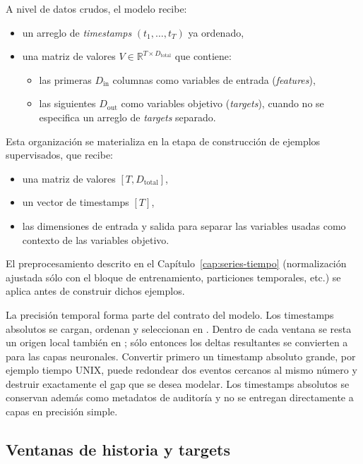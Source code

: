 A nivel de datos crudos, el modelo recibe:
\begin{itemize}
    \item un arreglo de \emph{timestamps} $(t_1,\dots,t_T)$ ya ordenado,
    \item una matriz de valores $V \in \mathbb{R}^{T \times D_{\text{total}}}$ que contiene:
    \begin{itemize}
        \item las primeras $D_{\text{in}}$ columnas como variables de entrada (\emph{features}),
        \item las siguientes $D_{\text{out}}$ como variables objetivo (\emph{targets}), cuando no se especifica un arreglo de \emph{targets} separado.
    \end{itemize}
\end{itemize}

Esta organización se materializa en la etapa de construcción de ejemplos supervisados, que recibe:
\begin{itemize}
    \item una matriz de valores $[T, D_{\text{total}}]$,
    \item un vector de timestamps $[T]$,
    \item las dimensiones de entrada y salida para separar las variables usadas como contexto de las variables objetivo.
\end{itemize}

El preprocesamiento descrito en el Capítulo~\ref{cap:series-tiempo} (normalización ajustada sólo con el bloque de entrenamiento, particiones temporales, etc.) se aplica antes de construir dichos ejemplos.

La precisión temporal forma parte del contrato del modelo. Los timestamps absolutos se cargan, ordenan y seleccionan en . Dentro de cada ventana se resta un origen local también en ; sólo entonces los deltas resultantes se convierten a  para las capas neuronales. Convertir primero un timestamp absoluto grande, por ejemplo tiempo UNIX, puede redondear dos eventos cercanos al mismo número y destruir exactamente el gap que se desea modelar. Los timestamps absolutos se conservan además como metadatos de auditoría y no se entregan directamente a capas en precisión simple.

\subsection{Ventanas de historia y targets}
\label{sec:timeseriesdataset-detalle}

